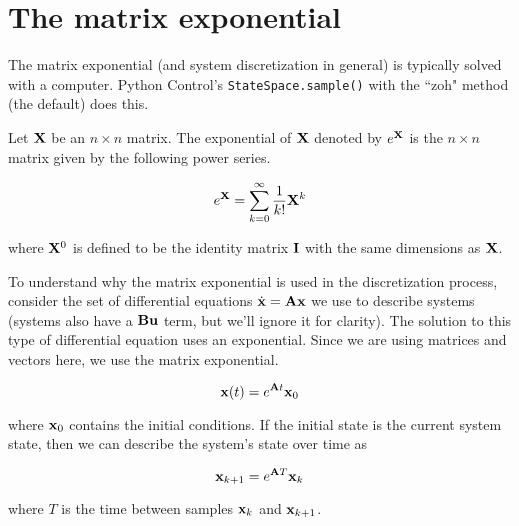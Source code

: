 \section{The matrix exponential}

The matrix exponential (and \gls{system} \gls{discretization} in general) is
typically solved with a computer. Python Control's \texttt{StateSpace.sample()}
with the ``zoh" method (the default) does this.

\begin{definition}
  Let $\mathbf{X}$ be an $n \times n$ matrix. The exponential of $\mathbf{X}$ denoted
  by $e^{\mathbf{X}}$ is the $n \times n$ matrix given by the following power
  series.

  \begin{equation}
    e^{\mathbf{X}} = \sum_{k=0}^\infty \frac{1}{k!} \mathbf{X}^k \label{eq:mat_exp}
  \end{equation}

  where $\mathbf{X}^0$ is defined to be the identity matrix $\mathbf{I}$ with the same
  dimensions as $\mathbf{X}$.
\end{definition}

To understand why the matrix exponential is used in the \gls{discretization}
process, consider the set of differential equations
$\dot{\mathbf{x}} = \mathbf{A}\mathbf{x}$ we use to describe \glspl{system}
(\glspl{system} also have a $\mathbf{B}\mathbf{u}$ term, but we'll ignore it for
clarity). The solution to this type of differential equation uses an
exponential. Since we are using matrices and vectors here, we use the matrix
exponential.

\begin{equation*}
  \mathbf{x}(t) = e^{\mathbf{A}t} \mathbf{x}_0
\end{equation*}

where $\mathbf{x}_0$ contains the initial conditions. If the initial \gls{state} is
the current system \gls{state}, then we can describe the \gls{system}'s
\gls{state} over time as

\begin{equation*}
  \mathbf{x}_{k+1} = e^{\mathbf{A}T} \mathbf{x}_k
\end{equation*}

where $T$ is the time between samples $\mathbf{x}_k$ and $\mathbf{x}_{k+1}$.
